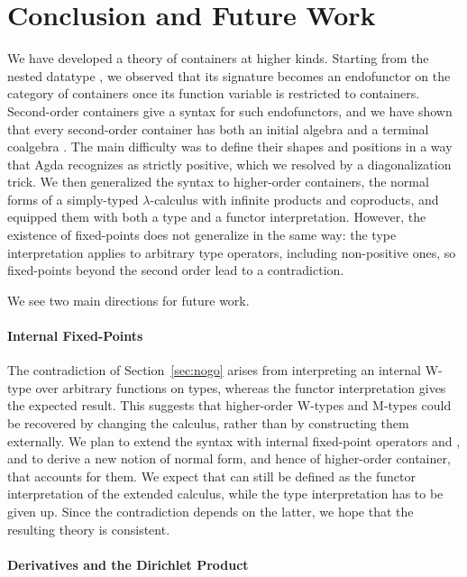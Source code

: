 \section{Conclusion and Future Work}
\label{sec:conclusions}

We have developed a theory of containers at higher kinds. Starting from the nested datatype , we observed that its signature becomes an endofunctor on the category of containers once its function variable is restricted to containers. Second-order containers give a syntax for such endofunctors, and we have shown that every second-order container has both an initial algebra  and a terminal coalgebra . The main difficulty was to define their shapes and positions in a way that Agda recognizes as strictly positive, which we resolved by a diagonalization trick. We then generalized the syntax to higher-order containers, the normal forms of a simply-typed $λ$-calculus with infinite products and coproducts, and equipped them with both a type and a functor interpretation. However, the existence of fixed-points does not generalize in the same way: the type interpretation applies to arbitrary type operators, including non-positive ones, so fixed-points beyond the second order lead to a contradiction.

We see two main directions for future work.

\paragraph*{Internal Fixed-Points}

The contradiction of Section~\ref{sec:nogo} arises from interpreting an internal W-type over arbitrary functions on types, whereas the functor interpretation gives the expected result. This suggests that higher-order W-types and M-types could be recovered by changing the calculus, rather than by constructing them externally. We plan to extend the syntax with internal fixed-point operators  and , and to derive a new notion of normal form, and hence of higher-order container, that accounts for them. We expect that  can still be defined as the functor interpretation of the extended calculus, while the type interpretation has to be given up. Since the contradiction depends on the latter, we hope that the resulting theory is consistent.

\paragraph*{Derivatives and the Dirichlet Product}

